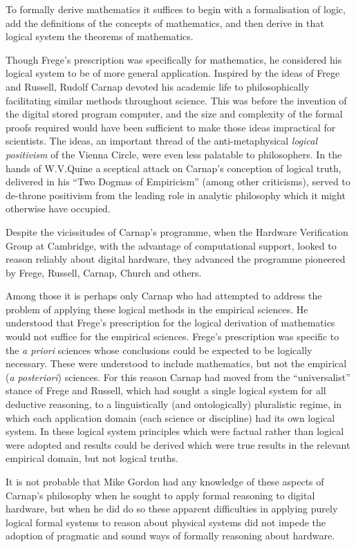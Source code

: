 \documentclass[10pt,titlepage]{book}
\begin{document}
To formally derive mathematics it suffices to begin with a formalisation of logic, add the definitions of the concepts of mathematics, and then derive in that logical system the theorems of mathematics.

Though Frege's prescription was specifically for mathematics, he considered his logical system to be of more general application.
Inspired by the ideas of Frege and Russell, Rudolf Carnap devoted his academic life to philosophically facilitating similar methods throughout science.
This was before the invention of the digital stored program computer, and the size and complexity of the formal proofs required would have been sufficient to make those ideas impractical for scientists.
The ideas, an important thread of the anti-metaphysical \emph{logical positivism} of the Vienna Circle, were even less palatable to philosophers.
In the hands of W.V.Quine a sceptical attack on Carnap's conception of logical truth, delivered in his ``Two Dogmas of Empiricism''\cite{quine53} (among other criticisms), served to de-throne positivism from the leading role in analytic philosophy which it might otherwise have occupied.

Despite the vicissitudes of Carnap's programme, when the Hardware Verification Group at Cambridge, with the advantage of computational support, looked to reason reliably about digital hardware, they advanced the programme pioneered by Frege, Russell, Carnap, Church and others.

Among those it is perhaps only Carnap who had attempted to address the problem of applying these logical methods in the empirical sciences.
He understood that Frege's prescription for the logical derivation of mathematics would not suffice for the empirical sciences.
Frege's prescription was specific to the \emph{a priori} sciences whose conclusions could be expected to be logically necessary.
These were understood to include mathematics, but not the empirical (\emph{a posteriori}) sciences.
For this reason Carnap had moved from the ``universalist'' stance of Frege and Russell, which had sought a single logical system for all deductive reasoning, to a linguistically (and ontologically) pluralistic regime, in which each application domain (each science or discipline) had its own logical system.
In these logical system principles which were factual rather than logical were adopted and results could be derived which were true results in the relevant empirical domain, but not logical truths.

It is not probable that Mike Gordon had any knowledge of these aspects of Carnap's philosophy when he sought to apply formal reasoning to digital hardware, but when he did do so these apparent difficulties in applying purely logical formal systems to reason about physical systems did not impede the adoption of pragmatic and sound ways of formally reasoning about hardware.
\end{document}
